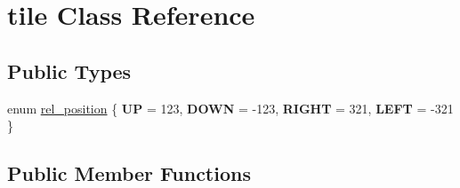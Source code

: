 \hypertarget{classtile}{\section{tile Class Reference}
\label{classtile}
}
\subsection*{Public Types}
\begin{DoxyCompactItemize}
\item 
enum \hyperlink{classtile_a637de74fd50d4b3583b657caa4bf0301}{rel\-\_\-position} \{ {\bfseries U\-P} = 123, 
{\bfseries D\-O\-W\-N} = -\/123, 
{\bfseries R\-I\-G\-H\-T} = 321, 
{\bfseries L\-E\-F\-T} = -\/321
 \}
\end{DoxyCompactItemize}
\subsection*{Public Member Functions}
